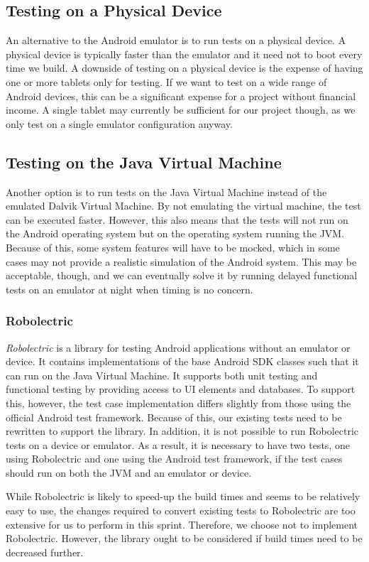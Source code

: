 \subsection{Testing on a Physical Device}
An alternative to the Android emulator is to run tests on a physical device. A physical device is typically faster than the emulator and it need not to boot every time we build. A downside of testing on a physical device is the expense of having one or more tablets only for testing. If we want to test on a wide range of Android devices, this can be a significant expense for a project without financial income. A single tablet may currently be sufficient for our project though, as we only test on a single emulator configuration anyway.

\subsection{Testing on the Java Virtual Machine}
Another option is to run tests on the Java Virtual Machine instead of the emulated Dalvik Virtual Machine. By not emulating the virtual machine, the test can be executed faster. However, this also means that the tests will not run on the Android operating system but on the operating system running the JVM\@. Because of this, some system features will have to be mocked, which in some cases may not provide a realistic simulation of the Android system. This may be acceptable, though, and we can eventually solve it by running delayed functional tests on an emulator at night when timing is no concern.

\subsubsection{Robolectric}
\emph{Robolectric} \parencite{robolectric2015} is a library for testing Android applications without an emulator or device. It contains implementations of the base Android SDK classes such that it can run on the Java Virtual Machine. It supports both unit testing and functional testing by providing access to UI elements and databases. To support this, however, the test case implementation differs slightly from those using the official Android test framework. Because of this, our existing tests need to be rewritten to support the library. In addition, it is not possible to run Robolectric tests on a device or emulator. As a result, it is necessary to have two tests, one using Robolectric and one using the Android test framework, if the test cases should run on both the JVM and an emulator or device.

While Robolectric is likely to speed-up the build times and seems to be relatively easy to use, the changes required to convert existing tests to Robolectric are too extensive for us to perform in this sprint. Therefore, we choose not to implement Robolectric. However, the library ought to be considered if build times need to be decreased further.

